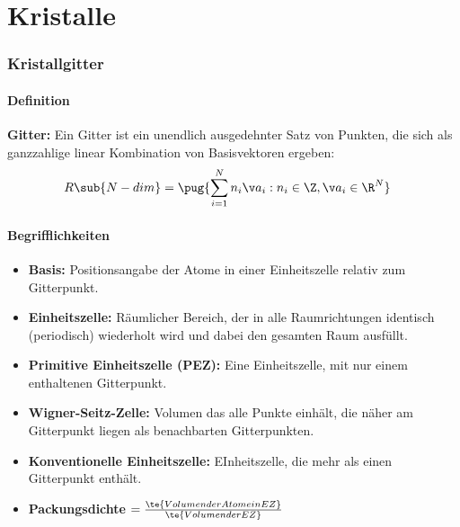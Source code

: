 \documentclass[bfvec]{summery_5.0}
\begin{document}
\part{Kristalle }
\section{Kristallgitter}
\subsection{Definition}
\begin{boxA}
{\bf Gitter:} Ein Gitter ist ein unendlich ausgedehnter Satz von Punkten, die sich als ganzzahlige linear Kombination von Basisvektoren ergeben:
\begin{align*}
    R\sub{N-dim} &= \pug{\sum_{i=1}^N n_i \v a_i : n_i \in \Z, \v a_i \in \R^N}
\end{align*} 
\end{boxA}

\subsection{Begrifflichkeiten}
\begin{itemize}
    \item {\bf Basis:} Positionsangabe der Atome in einer Einheitszelle relativ zum Gitterpunkt.
    \item {\bf Einheitszelle:} Räumlicher Bereich, der in alle Raumrichtungen identisch (periodisch) wiederholt wird und dabei den gesamten Raum ausfüllt.
    \item {\bf Primitive Einheitszelle (PEZ):} Eine Einheitszelle, mit nur einem enthaltenen Gitterpunkt.
    \item {\bf Wigner-Seitz-Zelle:} Volumen das alle Punkte einhält, die näher am Gitterpunkt liegen als benachbarten Gitterpunkten.
    \item {\bf Konventionelle Einheitszelle:} EInheitszelle, die mehr als einen Gitterpunkt enthält.
    \item {\bf Packungsdichte} $= \frac{\te{Volumen der Atome in EZ}}{\te{Volumen der EZ}}$
\end{itemize}
\end{document}
